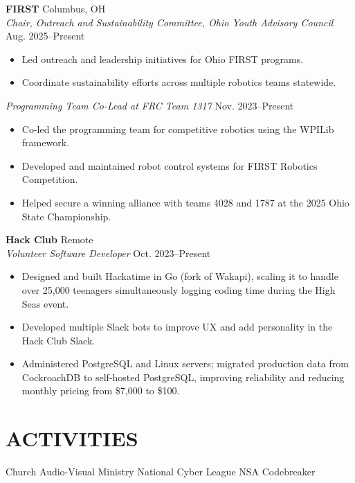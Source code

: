 \documentclass[a4paper,10pt]{article}
\newlength{\mpwidth}
\begin{document}
\textbf{FIRST} \hfill Columbus, OH\\
\textit{Chair, Outreach and Sustainability Committee, Ohio Youth Advisory Council} \hfill Aug. 2025--Present
\begin{minipage}{\mpwidth}
\begin{itemize}[nosep,after=\strut, leftmargin=1em, itemsep=3pt,label=--]
\item Led outreach and leadership initiatives for Ohio FIRST programs.
\item Coordinate sustainability efforts across multiple robotics teams statewide.
\end{itemize}
\end{minipage}

\textit{Programming Team Co-Lead at FRC Team 1317} \hfill Nov. 2023--Present
\begin{minipage}{\mpwidth}
\begin{itemize}[nosep,after=\strut, leftmargin=1em, itemsep=3pt,label=--]
\item Co-led the programming team for competitive robotics using the WPILib framework.
\item Developed and maintained robot control systems for FIRST Robotics Competition.
\item Helped secure a winning alliance with teams 4028 and 1787 at the 2025 Ohio State Championship.
\end{itemize}
\end{minipage}

\textbf{Hack Club} \hfill Remote\\
\textit{Volunteer Software Developer} \hfill Oct. 2023--Present
\begin{minipage}{\mpwidth}
\begin{itemize}[nosep,after=\strut, leftmargin=1em, itemsep=3pt,label=--]
\item Designed and built Hackatime in Go (fork of Wakapi), scaling it to handle over 25,000 teenagers simultaneously logging coding time during the High Seas event.
\item Developed multiple Slack bots to improve UX and add personality in the Hack Club Slack.
\item Administered PostgreSQL and Linux servers; migrated production data from CockroachDB to self-hosted PostgreSQL, improving reliability and reducing monthly pricing from \$7,000 to \$100.
\end{itemize}
\end{minipage}

\section{ACTIVITIES}
\begin{center}
{\small Church Audio-Visual Ministry \textbar{} National Cyber League \textbar{} NSA Codebreaker}
\end{center}

\vfill
\end{document}
